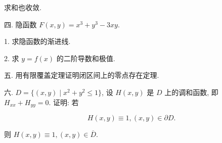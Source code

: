 \documentclass{examcollection}
\renewcommand{\displayformula}[1]{\[#1\]}
\begin{document}
{\begin{minipage}{\textwidth}
求和也收敛.\par
四. 隐函数 $F(x, y) = x^3 + y^3 - 3xy$.\par
1. 求隐函数的渐进线.\par
2. 求  $y = f(x)$  的二阶导数和极值.\par
五. 用有限覆盖定理证明闭区间上的零点存在定理.\par
六. $D = \{(x,y) \mid x^2 + y^2 \leq 1\}$, 设 $H(x,y)$ 是 $D$ 上的调和函数, 即 $H_{xx} + H_{yy} = 0$. 证明: 若\par
\displayformula{H (x, y) \equiv 1, (x, y) \in \partial D.}\par
则 $H(x,y)\equiv 1,(x,y)\in \overline{D}.$\par
\end{minipage}}
\ifdim\dimexpr\ht\proofbox+\dp\proofbox\relax>\textheight
\noindent\resizebox{!}{\textheight}{\usebox{\proofbox}}\else\noindent\usebox{\proofbox}\fi\clearpage
\end{document}

